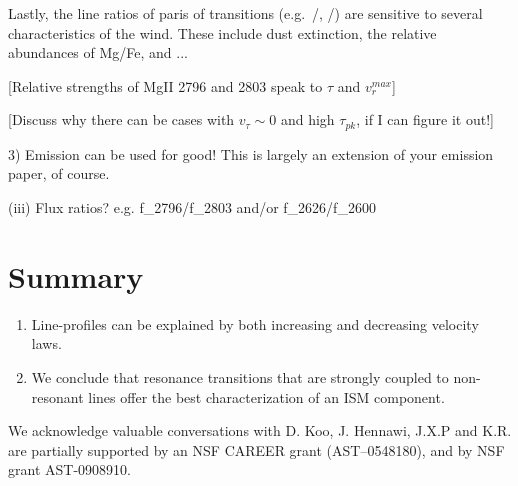 \documentclass[12pt,preprint]{aastex}
\begin{document}
Lastly, the line ratios of paris of transitions (e.g.\ \mgiia/\mgiib,
\feiic/\feiid) are sensitive to several characteristics of the wind.
These include dust extinction, the relative abundances of Mg/Fe, and
...

[Relative strengths of MgII 2796 and 2803 speak to $\tau$ and
$v_r^{max}$]

[Discuss why there can be cases with $v_\tau \sim 0$ and high
$\tau_{pk}$, if I can figure it out!]


3)  Emission can be used for good!   This is largely an extension of
your emission paper, of course.

 (iii)  Flux ratios?  e.g.   f\_2796/f\_2803 and/or f\_2626/f\_2600

\section{Summary}
\label{sec:summary}


\begin{enumerate}
\item Line-profiles can be explained by both increasing and decreasing
velocity laws.

\item We conclude that resonance transitions that are strongly coupled to
non-resonant lines offer the best
characterization of an ISM component.
\end{enumerate}

\acknowledgments

We acknowledge valuable conversations with D. Koo, J. Hennawi, 
J.X.P and K.R. are partially supported
by an NSF CAREER grant (AST--0548180), and 
by NSF grant AST-0908910.

\clearpage

%
%



\clearpage







\end{document}
